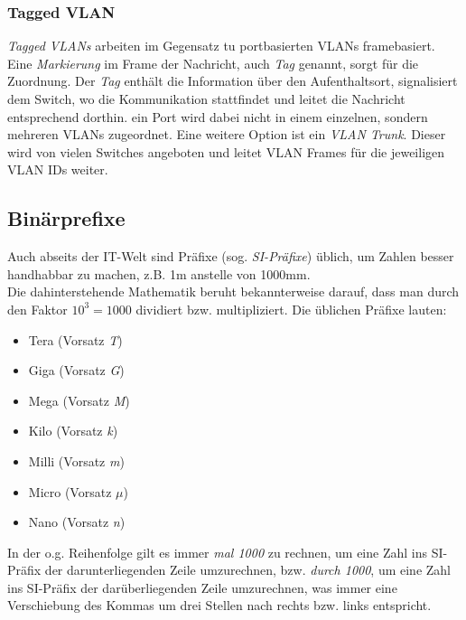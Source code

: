 \documentclass[a4paper, 12pt]{report}
\begin{document}
\newpage
\subsubsection{Tagged VLAN}
\emph{Tagged VLANs} arbeiten im Gegensatz tu portbasierten VLANs framebasiert. 
Eine \emph{Markierung} im Frame der Nachricht, auch \emph{Tag} genannt, sorgt 
für die Zuordnung. Der \emph{Tag} enthält die Information über den 
Aufenthaltsort, signalisiert dem Switch, wo die Kommunikation stattfindet und
leitet die Nachricht entsprechend dorthin. ein Port wird dabei nicht in einem 
einzelnen, sondern mehreren VLANs zugeordnet. Eine weitere Option ist ein 
\emph{VLAN Trunk}. Dieser wird von vielen Switches angeboten und leitet VLAN
Frames für die jeweiligen VLAN IDs weiter.

\subsection{Binärprefixe}

Auch abseits der IT-Welt sind Präfixe (sog. \emph{SI-Präfixe}) üblich, um Zahlen
besser handhabbar zu machen, z.B. 1m anstelle von 1000mm. \\

Die dahinterstehende Mathematik beruht bekannterweise darauf, dass man durch 
den Faktor $10^3 = 1000$ dividiert bzw. multipliziert. Die üblichen Präfixe
lauten: 

\begin{itemize}
    \item Tera (Vorsatz \emph{T})
    \item Giga (Vorsatz \emph{G})
    \item Mega (Vorsatz \emph{M})
    \item Kilo (Vorsatz \emph{k})
    \item Milli (Vorsatz \emph{m})
    \item Micro (Vorsatz \emph{$\mu$})
    \item Nano (Vorsatz \emph{n})
\end{itemize}

In der o.g. Reihenfolge gilt es immer \emph{\glqq mal 1000\grqq{}} zu rechnen, 
um eine Zahl ins SI-Präfix der darunterliegenden Zeile umzurechnen, bzw. 
\emph{\glqq durch 1000\grqq{}}, um eine Zahl ins SI-Präfix der darüberliegenden 
Zeile umzurechnen, was immer eine Verschiebung des Kommas um drei Stellen nach 
rechts bzw. links entspricht. \\
\end{document}
